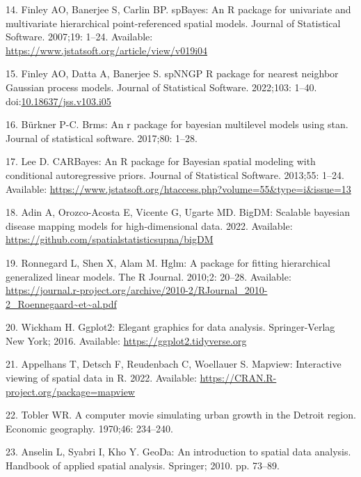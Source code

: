 \documentclass[10pt,letterpaper]{article}
\begin{document}
\leavevmode\hypertarget{ref-finley2007spbayes}{}%
14. Finley AO, Banerjee S, Carlin BP. spBayes: An R package for
univariate and multivariate hierarchical point-referenced spatial
models. Journal of Statistical Software. 2007;19: 1--24. Available:
\url{https://www.jstatsoft.org/article/view/v019i04}

\leavevmode\hypertarget{ref-finley2002spnngp}{}%
15. Finley AO, Datta A, Banerjee S. spNNGP R package for nearest
neighbor Gaussian process models. Journal of Statistical Software.
2022;103: 1--40.
doi:\href{https://doi.org/10.18637/jss.v103.i05}{10.18637/jss.v103.i05}

\leavevmode\hypertarget{ref-burkner2017brms}{}%
16. Bürkner P-C. Brms: An r package for bayesian multilevel models using
stan. Journal of statistical software. 2017;80: 1--28.

\leavevmode\hypertarget{ref-lee2013carbayes}{}%
17. Lee D. CARBayes: An R package for Bayesian spatial modeling with
conditional autoregressive priors. Journal of Statistical Software.
2013;55: 1--24. Available:
\url{https://www.jstatsoft.org/htaccess.php?volume=55\&type=i\&issue=13}

\leavevmode\hypertarget{ref-adin2022bigdm}{}%
18. Adin A, Orozco-Acosta E, Vicente G, Ugarte MD. BigDM: Scalable
bayesian disease mapping models for high-dimensional data. 2022.
Available: \url{https://github.com/spatialstatisticsupna/bigDM}

\leavevmode\hypertarget{ref-ronnegard2010hglm}{}%
19. Ronnegard L, Shen X, Alam M. Hglm: A package for fitting
hierarchical generalized linear models. The R Journal. 2010;2: 20--28.
Available:
\url{https://journal.r-project.org/archive/2010-2/RJournal_2010-2_Roennegaard~et~al.pdf}

\leavevmode\hypertarget{ref-wickham2016ggplot2}{}%
20. Wickham H. Ggplot2: Elegant graphics for data analysis.
Springer-Verlag New York; 2016. Available:
\url{https://ggplot2.tidyverse.org}

\leavevmode\hypertarget{ref-appelhans2022mapview}{}%
21. Appelhans T, Detsch F, Reudenbach C, Woellauer S. Mapview:
Interactive viewing of spatial data in R. 2022. Available:
\url{https://CRAN.R-project.org/package=mapview}

\leavevmode\hypertarget{ref-tobler1970computer}{}%
22. Tobler WR. A computer movie simulating urban growth in the Detroit
region. Economic geography. 1970;46: 234--240.

\leavevmode\hypertarget{ref-anselin2010geoda}{}%
23. Anselin L, Syabri I, Kho Y. GeoDa: An introduction to spatial data
analysis. Handbook of applied spatial analysis. Springer; 2010. pp.
73--89.
\end{document}
